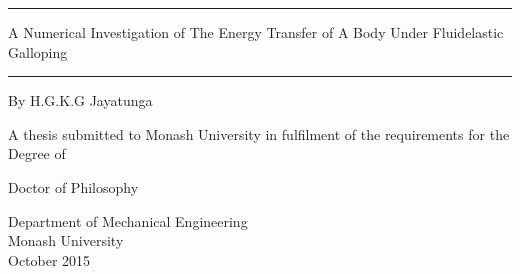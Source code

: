 \documentclass[11pt,titlepage,twoside,a4paper]{report}
\newcommand{\myclearpage}{\thispagestyle{empty}\cleartoevenpage\thispagestyle{empty}\cleartooddpage}
\begin{document}
\begin{titlepage}
\noindent\rule{\textwidth}{1.5pt}
\begin{flushright}
\LARGE
{\sc A Numerical Investigation of The Energy Transfer of A Body Under Fluidelastic Galloping} \\

\noindent\rule{\textwidth}{1.5pt}

\LARGE
\vspace{30mm}
{\sc By H.G.K.G Jayatunga}
\vspace{30mm}

\normalsize
{\sc A thesis submitted to Monash University in fulfilment of the requirements for the Degree of}

\vspace{5mm}
\LARGE
{\sc Doctor of Philosophy}

\vspace{15mm}
\normalsize
Department of Mechanical Engineering\\
Monash University\\
October 2015
\end{flushright}

\end{titlepage}

\myclearpage

%
%
%
%       


%
%

\tableofcontents
{}
%
%


%

%
%

%




\end{document}
